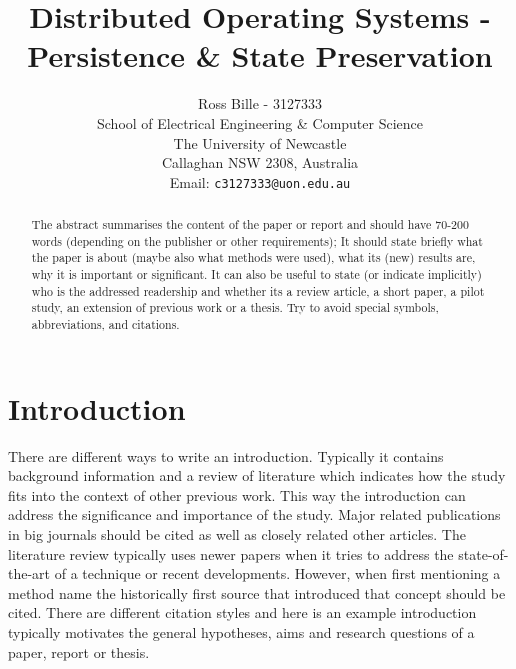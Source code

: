 \documentclass[a4paper,12pt]{article}
\begin{document}
%
\title{\bf Distributed Operating Systems - Persistence \& State Preservation}
%
\author{Ross Bille - 3127333\\
School of Electrical Engineering \& Computer Science\\
The University of Newcastle\\ Callaghan NSW 2308, Australia\\
Email: \texttt{c3127333@uon.edu.au} } 

\maketitle


\newpage
\begin{abstract}%
\noindent The abstract summarises the content of the paper or report and should have 70-200 words (depending on the publisher or other requirements); It
should state briefly what the paper is about (maybe also what
methods were used), what its (new) results are, why it is
important or significant. It can also be useful to state (or
indicate implicitly) who is the addressed readership and whether
its a review article, a short paper, a pilot study, an
extension of previous work or a thesis. Try to avoid special symbols, abbreviations, and citations.
\end{abstract}

\pagebreak

\tableofcontents

\pagebreak

\section{Introduction}

There are different ways to write an introduction. Typically it
contains background information and a review of literature which
indicates how the study fits into the context of other previous
work. This way the introduction can  address the significance and importance of the study. Major related publications in big journals should be cited
as well as closely related other articles. The literature review typically uses newer papers when it tries to address the state-of-the-art of a technique or recent developments. However, when first mentioning a method name the historically first source that introduced that concept should be cited. There are different citation styles and here is an example introduction
typically motivates the general hypotheses, aims and research questions
of a paper, report or thesis.  
\end{document}
